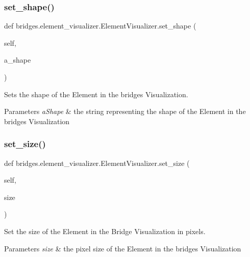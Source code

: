 \subsubsection{\texorpdfstring{set\+\_\+shape()}{set\_shape()}}
{\footnotesize\ttfamily def bridges.\+element\+\_\+visualizer.\+Element\+Visualizer.\+set\+\_\+shape (\begin{DoxyParamCaption}\item[{}]{self,  }\item[{}]{a\+\_\+shape }\end{DoxyParamCaption})}



Sets the shape of the Element in the bridges Visualization. 


\begin{DoxyParams}{Parameters}
{\em a\+Shape} & the string representing the shape of the Element in the bridges Visualization \\
\hline
\end{DoxyParams}
\mbox{\label{classbridges_1_1element__visualizer_1_1_element_visualizer_a4c258c07eebe5d3e81fd0dbfb017e171}} 
\subsubsection{\texorpdfstring{set\+\_\+size()}{set\_size()}}
{\footnotesize\ttfamily def bridges.\+element\+\_\+visualizer.\+Element\+Visualizer.\+set\+\_\+size (\begin{DoxyParamCaption}\item[{}]{self,  }\item[{}]{size }\end{DoxyParamCaption})}



Set the size of the Element in the Bridge Visualization in pixels. 


\begin{DoxyParams}{Parameters}
{\em size} & the pixel size of the Element in the bridges Visualization \\
\hline
\end{DoxyParams}


